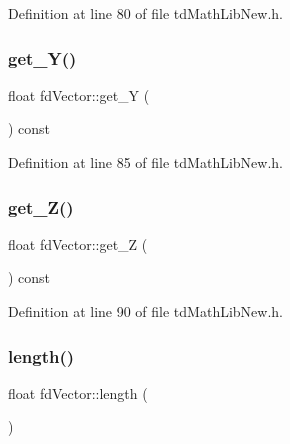 Definition at line 80 of file td\+Math\+Lib\+New.\+h.

\hypertarget{classfd_vector_af0d8177ae244369991268b35afcbac9e}{}\label{classfd_vector_af0d8177ae244369991268b35afcbac9e} 
\subsubsection{\texorpdfstring{get\+\_\+\+Y()}{get\_Y()}}
{\footnotesize\ttfamily float fd\+Vector\+::get\+\_\+Y (\begin{DoxyParamCaption}{ }\end{DoxyParamCaption}) const\hspace{0.3cm}{\ttfamily [inline]}}



Definition at line 85 of file td\+Math\+Lib\+New.\+h.

\hypertarget{classfd_vector_afe07c9988db316dcc52e1115f82814dd}{}\label{classfd_vector_afe07c9988db316dcc52e1115f82814dd} 
\subsubsection{\texorpdfstring{get\+\_\+\+Z()}{get\_Z()}}
{\footnotesize\ttfamily float fd\+Vector\+::get\+\_\+Z (\begin{DoxyParamCaption}{ }\end{DoxyParamCaption}) const\hspace{0.3cm}{\ttfamily [inline]}}



Definition at line 90 of file td\+Math\+Lib\+New.\+h.

\hypertarget{classfd_vector_aa87e134a74c0aedc1ce1b132b577702a}{}\label{classfd_vector_aa87e134a74c0aedc1ce1b132b577702a} 
\subsubsection{\texorpdfstring{length()}{length()}}
{\footnotesize\ttfamily float fd\+Vector\+::length (\begin{DoxyParamCaption}{ }\end{DoxyParamCaption})\hspace{0.3cm}{\ttfamily [inline]}}



